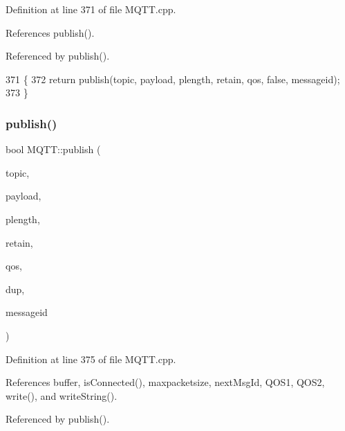 Definition at line 371 of file M\+Q\+T\+T.\+cpp.



References publish().



Referenced by publish().


\begin{DoxyCode}
371                                                                                                            
                              \{
372     \textcolor{keywordflow}{return} publish(topic, payload, plength, retain, qos, \textcolor{keyword}{false}, messageid);
373 \}
\end{DoxyCode}
\mbox{\label{class_m_q_t_t_a11b8368945d62d46acf4e7d41c57e3c3}} 
\subsubsection{publish()\hspace{0.1cm}{\footnotesize\ttfamily [10/10]}}
{\footnotesize\ttfamily bool M\+Q\+T\+T\+::publish (\begin{DoxyParamCaption}\item[{const char $\ast$}]{topic,  }\item[{const uint8\+\_\+t $\ast$}]{payload,  }\item[{unsigned int}]{plength,  }\item[{bool}]{retain,  }\item[{\textbf{ E\+M\+Q\+T\+T\+\_\+\+Q\+OS}}]{qos,  }\item[{bool}]{dup,  }\item[{uint16\+\_\+t $\ast$}]{messageid }\end{DoxyParamCaption})}



Definition at line 375 of file M\+Q\+T\+T.\+cpp.



References buffer, is\+Connected(), maxpacketsize, next\+Msg\+Id, Q\+O\+S1, Q\+O\+S2, write(), and write\+String().



Referenced by publish().


